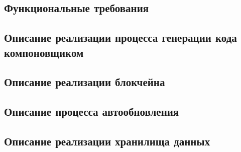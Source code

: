\subsection{Функциональные требования}


\subsection{Описание реализации процесса генерации кода компоновщиком}


\subsection{Описание реализации блокчейна}


\subsection{Описание процесса автообновления}


\subsection{Описание реализации хранилища данных}

